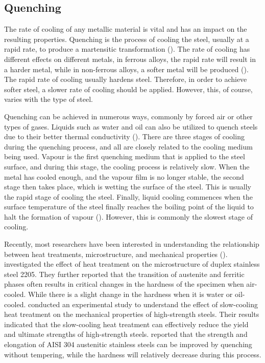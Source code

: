 \subsection{Quenching}  
The rate of cooling of any metallic material is vital and has an impact on the resulting properties. Quenching is the process of cooling the steel, usually at a rapid rate, to produce a martensitic transformation (\cite{singh2020applied}). The rate of cooling has different effects on different metals, in ferrous alloys, the rapid rate will result in a harder metal, while in non-ferrous alloys, a softer metal will be produced (\cite{mampuya2021effect}). The rapid rate of cooling usually hardens steel. Therefore, in order to achieve softer steel, a slower rate of cooling should be applied. However, this, of course, varies with the type of steel. 

Quenching can be achieved in numerous ways, commonly by forced air or other types of gases. Liquids such as water and oil can also be utilized to quench steels due to their better thermal conductivity (\cite{singh2020applied}). There are three stages of cooling during the quenching process, and all are closely related to the cooling medium being used. Vapour is the first quenching medium that is applied to the steel surface, and during this stage, the cooling process is relatively slow. When the metal has cooled enough, and the vapour film is no longer stable, the second stage then takes place, which is wetting the surface of the steel. This is usually the rapid stage of cooling the steel. Finally, liquid cooling commences when the surface temperature of the steel finally reaches the boiling point of the liquid to halt the formation of vapour (\cite{marzorati2018green, protopopoff2011surface}). However, this is commonly the slowest stage of cooling.

Recently, most researchers have been interested in understanding the relationship between heat treatments, microstructure, and mechanical properties (\cite{marzorati2018green, whitman1924effect, cai2018influence}). \cite{mampuya2021effect} investigated the effect of heat treatment on the microstructure of duplex stainless steel 2205. They further reported that the transition of austenite and ferritic phases often results in critical changes in the hardness of the specimen when air-cooled. While there is a slight change in the hardness when it is water or oil-cooled. \cite{zhang2021influence} conducted an experimental study to understand the effect of slow-cooling heat treatment on the mechanical properties of high-strength steels. Their results indicated that the slow-cooling heat treatment can effectively reduce the yield and ultimate strengths of high-strength steels. \cite{essoussi2019heat} reported that the strength and elongation of AISI 304 austenitic stainless steels can be improved by quenching without tempering, while the hardness will relatively decrease during this process.

